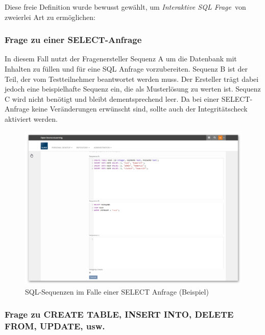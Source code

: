     Diese freie Definition wurde bewusst gewählt, um \glqq\textit{Interaktive SQL Frage}\grqq\ von zweierlei Art zu ermöglichen:
    
    \subsubsection{Frage zu einer SELECT-Anfrage}
    
        In diesem Fall nutzt der Fragenersteller Sequenz A um die Datenbank mit Inhalten zu füllen und für eine SQL Anfrage vorzubereiten. Sequenz B ist der Teil, der vom Testteilnehmer beantwortet werden muss. Der Ersteller trägt dabei jedoch eine beispielhafte Sequenz ein, die als Musterlösung zu werten ist. Sequenz C wird nicht benötigt und bleibt dementsprechend leer. Da bei einer SELECT-Anfrage keine Veränderungen erwünscht sind, sollte auch der Integritätscheck aktiviert werden.
        
        \begin{figure}[H]
            \begin{center}
                \includegraphics[page=1, width=0.7\paperwidth, trim=4 4 4 4, clip]{fig/Beispiel-SQL-Sequenzen-bei-SELECT-Anfrage.png} 
                \caption{SQL-Sequenzen im Falle einer SELECT Anfrage (Beispiel)}
                \label{fig:beispiel-sql-sequenzen-bei-select-anfrage}
            \end{center}
        \end{figure}
        
    \subsubsection{Frage zu CREATE TABLE, INSERT INTO, DELETE FROM, UPDATE, usw.}
    
